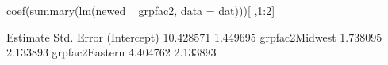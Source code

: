 \begin{Schunk}
\begin{Sinput}
  coef(summary(lm(newed ~ grpfac2, data = dat)))[ ,1:2]
\end{Sinput}
\begin{Soutput}
                Estimate Std. Error
(Intercept)    10.428571   1.449695
grpfac2Midwest  1.738095   2.133893
grpfac2Eastern  4.404762   2.133893
\end{Soutput}
\end{Schunk}
